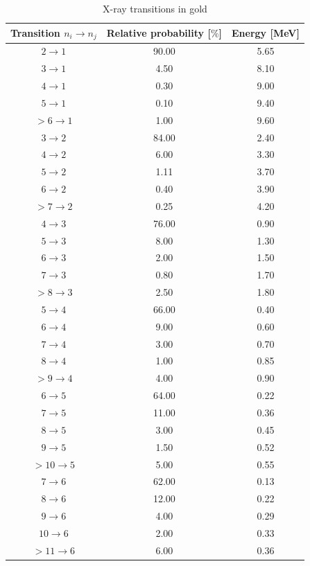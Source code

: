 \documentclass[12pt]{article}
\begin{document}
\begin{table}[htpb]
\caption{X-ray transitions in gold}
\centering
\begin{tabular}{c c c}
\hline\hline
Transition $n_i \rightarrow n_j$ & Relative probability [$\%$] & Energy [MeV]\\ [0.5ex]
\hline
$2 \rightarrow 1$ & 90.00 & 5.65 \\
$3 \rightarrow 1$ & 4.50 & 8.10 \\
$4 \rightarrow 1$ & 0.30 & 9.00 \\
$5 \rightarrow 1$ & 0.10 & 9.40 \\
$>6 \rightarrow 1$ & 1.00 & 9.60 \\ [0.5ex]
\hline
$3 \rightarrow 2$ & 84.00 & 2.40 \\
$4 \rightarrow 2$ & 6.00 & 3.30 \\
$5 \rightarrow 2$ & 1.11 & 3.70 \\
$6 \rightarrow 2$ & 0.40 & 3.90 \\
$>7 \rightarrow 2$ & 0.25 & 4.20 \\ [0.5ex]
\hline
$4 \rightarrow 3$ & 76.00 & 0.90 \\
$5 \rightarrow 3$ & 8.00 & 1.30 \\
$6 \rightarrow 3$ & 2.00 & 1.50 \\
$7 \rightarrow 3$ & 0.80 & 1.70 \\
$>8 \rightarrow 3$ & 2.50 & 1.80 \\ [0.5ex]
\hline
$5 \rightarrow 4$ & 66.00 & 0.40 \\
$6 \rightarrow 4$ & 9.00 & 0.60 \\
$7 \rightarrow 4$ & 3.00 & 0.70 \\
$8 \rightarrow 4$ & 1.00 & 0.85 \\
$>9 \rightarrow 4$ & 4.00 & 0.90 \\ [0.5ex]
\hline
$6 \rightarrow 5$ & 64.00 & 0.22 \\
$7 \rightarrow 5$ & 11.00 & 0.36 \\
$8 \rightarrow 5$ & 3.00 & 0.45 \\
$9 \rightarrow 5$ & 1.50 & 0.52 \\
$>10 \rightarrow 5$ & 5.00 & 0.55 \\ [0.5ex]
\hline
$7 \rightarrow 6$ & 62.00 & 0.13 \\
$8 \rightarrow 6$ & 12.00 & 0.22 \\
$9 \rightarrow 6$ & 4.00 & 0.29 \\
$10 \rightarrow 6$ & 2.00 & 0.33 \\
$>11 \rightarrow 6$ & 6.00 & 0.36 \\ [1ex]
\hline
\end{tabular}
\label{table:cascade}
\end{table}
\end{document}

